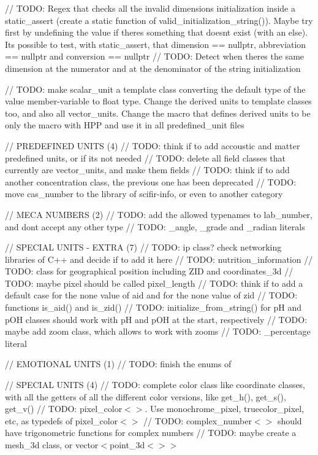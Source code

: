 // TODO\+: Regex that checks all the invalid dimensions initialization inside a static\+\_\+assert (create a static function of valid\+\_\+initialization\+\_\+string()). Maybe try first by undefining the value if there\textquotesingle{}s something that doesn\textquotesingle{}t exist (with an else). It\textquotesingle{}s possible to test, with static\+\_\+assert, that dimension == nullptr, abbreviation == nullptr and conversion == nullptr // TODO\+: Detect when there\textquotesingle{}s the same dimension at the numerator and at the denominator of the string initialization

// TODO\+: make scalar\+\_\+unit a template class converting the default type of the value member-\/variable to float type. Change the derived units to template classes too, and also all vector\+\_\+units. Change the macro that defines derived units to be only the macro with HPP and use it in all predefined\+\_\+unit files

// PREDEFINED UNITS (4) // TODO\+: think if to add accoustic and matter predefined units, or if it\textquotesingle{}s not needed // TODO\+: delete all field classes that currently are vector\+\_\+units, and make them fields // TODO\+: think if to add another concentration class, the previous one has been deprecated // TODO\+: move cas\+\_\+number to the library of scifir-\/info, or even to another category

// MECA NUMBERS (2) // TODO\+: add the allowed typenames to lab\+\_\+number, and don\textquotesingle{}t accept any other type // TODO\+: \+\_\+angle, \+\_\+grade and \+\_\+radian literals

// SPECIAL UNITS -\/ EXTRA (7) // TODO\+: ip class? check networking libraries of C++ and decide if to add it here // TODO\+: nutrition\+\_\+information // TODO\+: class for geographical position including ZID and coordinates\+\_\+3d // TODO\+: maybe pixel should be called pixel\+\_\+length // TODO\+: think if to add a default case for the none value of aid and for the none value of zid // TODO\+: functions is\+\_\+aid() and is\+\_\+zid() // TODO\+: initialize\+\_\+from\+\_\+string() for pH and p\+OH classes should work with pH and p\+OH at the start, respectively // TODO\+: maybe add zoom class, which allows to work with zooms // TODO\+: \+\_\+percentage literal

// EMOTIONAL UNITS (1) // TODO\+: finish the enums of 

// SPECIAL UNITS (4) // TODO\+: complete color class like coordinate classes, with all the getters of all the different color versions, like get\+\_\+h(), get\+\_\+s(), get\+\_\+v() // TODO\+: pixel\+\_\+color$<$$>$. Use monochrome\+\_\+pixel, truecolor\+\_\+pixel, etc, as typedefs of pixel\+\_\+color$<$$>$ // TODO\+: complex\+\_\+number$<$$>$ should have trigonometric functions for complex numbers // TODO\+: maybe create a mesh\+\_\+3d class, or vector$<$point\+\_\+3d$<$$>$$>$

